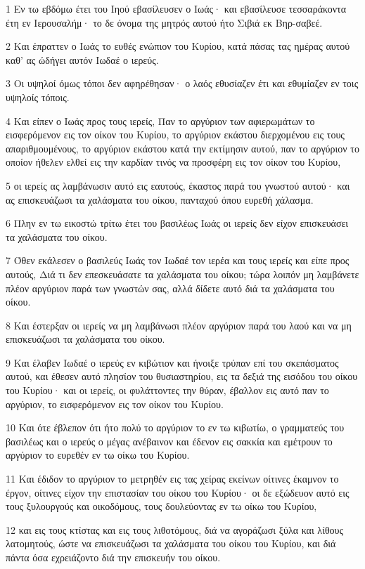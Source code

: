 \par 1 Εν τω εβδόμω έτει του Ιηού εβασίλευσεν ο Ιωάς· και εβασίλευσε τεσσαράκοντα έτη εν Ιερουσαλήμ· το δε όνομα της μητρός αυτού ήτο Σιβιά εκ Βηρ-σαβεέ.
\par 2 Και έπραττεν ο Ιωάς το ευθές ενώπιον του Κυρίου, κατά πάσας τας ημέρας αυτού καθ' ας ώδήγει αυτόν Ιωδαέ ο ιερεύς.
\par 3 Οι υψηλοί όμως τόποι δεν αφηρέθησαν· ο λαός εθυσίαζεν έτι και εθυμίαζεν εν τοις υψηλοίς τόποις.
\par 4 Και είπεν ο Ιωάς προς τους ιερείς, Παν το αργύριον των αφιερωμάτων το εισφερόμενον εις τον οίκον του Κυρίου, το αργύριον εκάστου διερχομένου εις τους απαριθμουμένους, το αργύριον εκάστου κατά την εκτίμησιν αυτού, παν το αργύριον το οποίον ήθελεν ελθεί εις την καρδίαν τινός να προσφέρη εις τον οίκον του Κυρίου,
\par 5 οι ιερείς ας λαμβάνωσιν αυτό εις εαυτούς, έκαστος παρά του γνωστού αυτού· και ας επισκευάζωσι τα χαλάσματα του οίκου, πανταχού όπου ευρεθή χάλασμα.
\par 6 Πλην εν τω εικοστώ τρίτω έτει του βασιλέως Ιωάς οι ιερείς δεν είχον επισκευάσει τα χαλάσματα του οίκου.
\par 7 Όθεν εκάλεσεν ο βασιλεύς Ιωάς τον Ιωδαέ τον ιερέα και τους ιερείς και είπε προς αυτούς, Διά τι δεν επεσκευάσατε τα χαλάσματα του οίκου; τώρα λοιπόν μη λαμβάνετε πλέον αργύριον παρά των γνωστών σας, αλλά δίδετε αυτό διά τα χαλάσματα του οίκου.
\par 8 Και έστερξαν οι ιερείς να μη λαμβάνωσι πλέον αργύριον παρά του λαού και να μη επισκευάζωσι τα χαλάσματα του οίκου.
\par 9 Και έλαβεν Ιωδαέ ο ιερεύς εν κιβώτιον και ήνοιξε τρύπαν επί του σκεπάσματος αυτού, και έθεσεν αυτό πλησίον του θυσιαστηρίου, εις τα δεξιά της εισόδου του οίκου του Κυρίου· και οι ιερείς, οι φυλάττοντες την θύραν, έβαλλον εις αυτό παν το αργύριον, το εισφερόμενον εις τον οίκον του Κυρίου.
\par 10 Και ότε έβλεπον ότι ήτο πολύ το αργύριον το εν τω κιβωτίω, ο γραμματεύς του βασιλέως και ο ιερεύς ο μέγας ανέβαινον και έδενον εις σακκία και εμέτρουν το αργύριον το ευρεθέν εν τω οίκω του Κυρίου.
\par 11 Και έδιδον το αργύριον το μετρηθέν εις τας χείρας εκείνων οίτινες έκαμνον το έργον, οίτινες είχον την επιστασίαν του οίκου του Κυρίου· οι δε εξώδευον αυτό εις τους ξυλουργούς και οικοδόμους, τους δουλεύοντας εν τω οίκω του Κυρίου,
\par 12 και εις τους κτίστας και εις τους λιθοτόμους, διά να αγοράζωσι ξύλα και λίθους λατομητούς, ώστε να επισκευάζωσι τα χαλάσματα του οίκου του Κυρίου, και διά πάντα όσα εχρειάζοντο διά την επισκευήν του οίκου.
